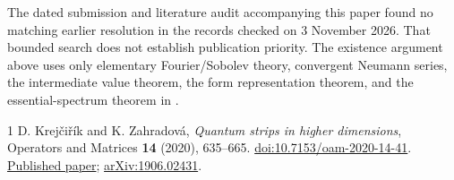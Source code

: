 \documentclass[11pt,a4paper]{article}
\begin{document}
The dated submission and literature audit accompanying this paper found
no matching earlier resolution in the records checked on 3 November 2026.
That bounded search does not establish publication priority. The existence argument above uses only elementary
Fourier/Sobolev theory, convergent Neumann series, the intermediate
value theorem, the form representation theorem, and the
essential-spectrum theorem in \cite{KZ}.

\begin{thebibliography}{1}
D. Krej\v ci\v r\'ik and K. Zahradov\'a,
\emph{Quantum strips in higher dimensions},
Operators and Matrices \textbf{14} (2020), 635--665.
\href{https://doi.org/10.7153/oam-2020-14-41}{doi:10.7153/oam-2020-14-41}.
\href{https://files.ele-math.com/articles/oam-14-41.pdf}{Published paper};
\href{https://arxiv.org/abs/1906.02431}{arXiv:1906.02431}.
\end{thebibliography}
\end{document}
